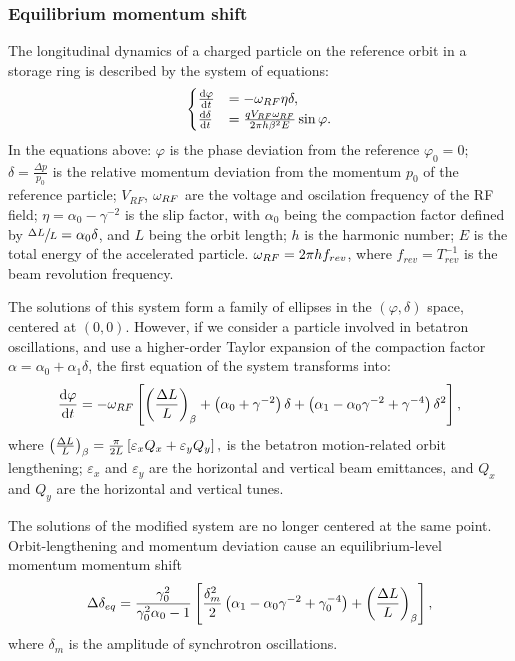 \documentclass{article}
\begin{document}
\subsubsection{Equilibrium momentum shift}
The longitudinal dynamics of a charged particle on the reference orbit in a storage ring is described by the system of equations:
\begin{equation*}
  \begin{cases}
    \frac{\mathrm{d} {\varphi}}{\mathrm{d} t} &= -\omega_{RF}\eta\delta, \\
    \frac{\mathrm{d} {\delta}}{\mathrm{d} t} &= \frac{q V_{RF}\omega_{RF}}{2\pi h\beta^2E}\sin\varphi.
  \end{cases}
\end{equation*}
In the equations above: $\varphi$ is the phase deviation from the reference $\varphi_0 = 0$; $\delta = \frac{\Delta p}{p_0}$ is the relative momentum deviation from the momentum $p_0$ of the reference particle; $V_{RF}$, $\omega_{RF}$ are the voltage and oscilation frequency of the RF field; $\eta = \alpha_0 - \gamma^{-2}$ is the slip factor, with $\alpha_0$ being the compaction factor defined by $\sfrac{\Delta L}{L} = \alpha_0\delta$, and $L$ being the orbit length; $h$ is the harmonic number; $E$ is the total energy of the accelerated particle. $\omega_{RF} = 2\pi h f_{rev}$, where $f_{rev}=T_{rev}^{-1}$ is the beam revolution frequency.

The solutions of this system form a family of ellipses in the $(\varphi, \delta)$ space, centered at $(0,0)$. However, if we consider a particle involved in betatron oscillations, and use a higher-order Taylor expansion of the compaction factor $\alpha = \alpha_0 + \alpha_1\delta$, the first equation of the system transforms into:~\citep[p.~2579]{Senichev:IPAC13}
\[
\ddt{\varphi} = -\w_{RF} \bkt*{\bkt{\frac{\Delta L}{L}}_\beta + \bkt{\alpha_0 + \gamma^{-2}}\delta + \bkt{\alpha_1 - \alpha_0\gamma^{-2} + \gamma^{-4}}\delta^2},
\]
where $\bkt{\frac{\Delta L}{L}}_\beta = \frac{\pi}{2L}\bkt*{\varepsilon_xQ_x + \varepsilon_yQ_y},$ is the betatron motion-related orbit lengthening; $\varepsilon_x$ and $\varepsilon_y$ are the horizontal and vertical beam emittances, and $Q_x$ and $Q_y$ are the horizontal and vertical tunes.~\citep[p.~2580]{Senichev:IPAC13}

The solutions of the modified system are no longer centered at the same point. Orbit-lengthening and momentum deviation cause an equilibrium-level momentum momentum shift~\citep[p.~2581]{Senichev:IPAC13}
\begin{equation}\label{eq:EquLevMom_shift}
  \Delta\delta_{eq} = \frac{\gamma_0^2}{\gamma_0^2\alpha_0 - 1}\bkt*{\frac{\delta_m^2}{2}\bkt{\alpha_1 - \alpha_0\gamma^{-2} + \gamma_0^{-4}} + \bkt{\frac{\Delta L}{L}}_\beta},
\end{equation}
where $\delta_m$ is the amplitude of synchrotron oscillations.
\end{document}

